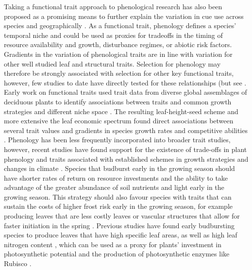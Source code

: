 \documentclass{article}\usepackage[]{graphicx}\usepackage[]{color}
\begin{document}
Taking a functional trait approach to phenological research has also been proposed as a promising means to further explain the variation in cue use across species and geographically \citep{Flynn2018,Osada2017}. As a functional trait, phenology defines a species' temporal niche and could be used as proxies for tradeoffs in the timing of resource availability and growth, disturbance regimes, or abiotic risk factors. Gradients in the variation of phenological traits are in line with variation for other well studied leaf and structural traits. Selection for phenology may therefore be strongly associated with selection for other key functional traits, however, few studies to date have directly tested for these relationships (but see \citep{Osada2017,Sun2006,Lechowicz1984}. Early work on functional traits used trait data from diverse global assemblages of deciduous plants to identify associations between traits and common growth strategies and different niche space \citep{Westoby1998,Wright2004,Chave2009}. The resulting leaf-height-seed scheme and more extensive the leaf economic spectrum found direct associations between several trait values and gradients in species growth rates and competitive abilities \citep{Westoby1998,Wright2004,Diaz2016,Chave2009,Funk2016}. Phenology has been less frequently incorporated into broader trait studies, however, recent studies have found support for the existence of trade-offs in plant phenology and traits associated with established schemes in growth strategies and changes in climate \citep{Konig2018 %
}.  Species that budburst early in the growing season should have shorter rates of return on resource investments and the ability to take advantage of the greater abundance of soil nutrients and light early in the growing season. This strategy should also favour species with traits that can sustain the costs of higher frost risk early in the growing season, for example producing leaves that are less costly leaves or vascular structures that allow for faster initiation in the spring \citep{Lechowicz1984,Lenz2016}. Previous studies have found early budbursting species to produce leaves that have high specific leaf areas, as well as high leaf nitrogen content \citep{citation}, which can be used as a proxy for plants' investment in photosynthetic potential and the production of photosynthetic enzymes like Rubisco \citep{Pereira2020}. %
\end{document}
